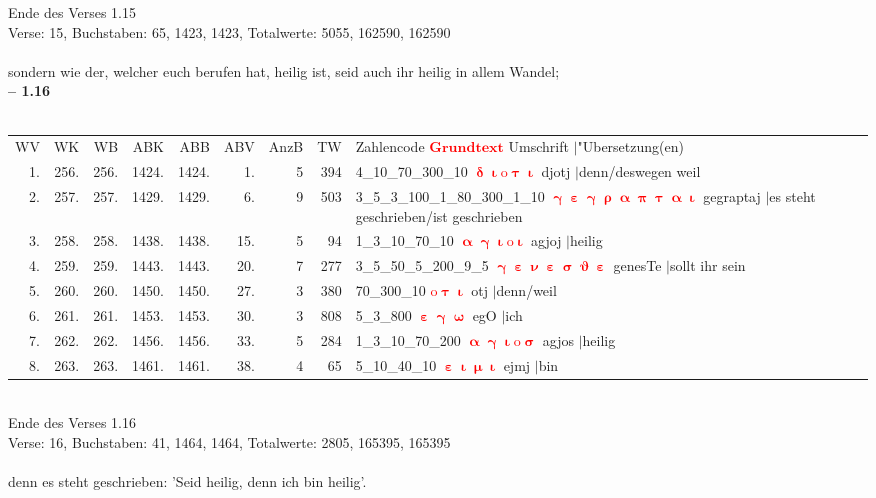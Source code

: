 \documentclass[a4paper,10pt,landscape]{article}
\begin{document}
Ende des Verses 1.15\\
Verse: 15, Buchstaben: 65, 1423, 1423, Totalwerte: 5055, 162590, 162590\\
\\
sondern wie der, welcher euch berufen hat, heilig ist, seid auch ihr heilig in allem Wandel;\\
\newpage 
{\bf -- 1.16}\\
\medskip \\
\begin{tabular}{rrrrrrrrp{120mm}}
WV&WK&WB&ABK&ABB&ABV&AnzB&TW&Zahlencode \textcolor{red}{$\boldsymbol{Grundtext}$} Umschrift $|$"Ubersetzung(en)\\
1.&256.&256.&1424.&1424.&1.&5&394&4\_10\_70\_300\_10 \textcolor{red}{$\boldsymbol{\updelta\upiota\mathrm{o}\uptau\upiota}$} djotj $|$denn/deswegen weil\\
2.&257.&257.&1429.&1429.&6.&9&503&3\_5\_3\_100\_1\_80\_300\_1\_10 \textcolor{red}{$\boldsymbol{\upgamma\upepsilon\upgamma\uprho\upalpha\uppi\uptau\upalpha\upiota}$} gegraptaj $|$es steht geschrieben/ist geschrieben\\
3.&258.&258.&1438.&1438.&15.&5&94&1\_3\_10\_70\_10 \textcolor{red}{$\boldsymbol{\upalpha\upgamma\upiota\mathrm{o}\upiota}$} agjoj $|$heilig\\
4.&259.&259.&1443.&1443.&20.&7&277&3\_5\_50\_5\_200\_9\_5 \textcolor{red}{$\boldsymbol{\upgamma\upepsilon\upnu\upepsilon\upsigma\upvartheta\upepsilon}$} genesTe $|$sollt ihr sein\\
5.&260.&260.&1450.&1450.&27.&3&380&70\_300\_10 \textcolor{red}{$\boldsymbol{\mathrm{o}\uptau\upiota}$} otj $|$denn/weil\\
6.&261.&261.&1453.&1453.&30.&3&808&5\_3\_800 \textcolor{red}{$\boldsymbol{\upepsilon\upgamma\upomega}$} egO $|$ich\\
7.&262.&262.&1456.&1456.&33.&5&284&1\_3\_10\_70\_200 \textcolor{red}{$\boldsymbol{\upalpha\upgamma\upiota\mathrm{o}\upsigma}$} agjos $|$heilig\\
8.&263.&263.&1461.&1461.&38.&4&65&5\_10\_40\_10 \textcolor{red}{$\boldsymbol{\upepsilon\upiota\upmu\upiota}$} ejmj $|$bin\\
\end{tabular}\medskip \\
Ende des Verses 1.16\\
Verse: 16, Buchstaben: 41, 1464, 1464, Totalwerte: 2805, 165395, 165395\\
\\
denn es steht geschrieben: 'Seid heilig, denn ich bin heilig'.\\
\end{document}
